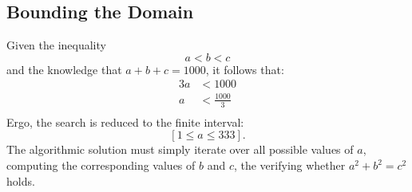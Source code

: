 \documentclass{article}
\theoremstyle{mytheoremstyle}
\theoremstyle{mytheoremstyle}
\theoremstyle{myproblemstyle}
\begin{document}
    \subsection{Bounding the Domain}\label{sub:Bounding the Domain} %
    Given the inequality \[
        a < b < c
    \] 
    and the knowledge that \( a + b + c = 1000 \), it follows that: \[
        \begin{align}
            3a &< 1000 \\ 
            a &< \frac{1000}{3} \\
        \end{align}
    \] 
    Ergo, the search is reduced to the finite interval: \[
        [1 \le a \le 333].
    \] 
    The algorithmic solution must simply iterate over all possible values of \( a \), computing the corresponding values
    of \( b \) and \( c \), the verifying whether \( a^2 + b^2 = c^2 \) holds.
\end{document}
